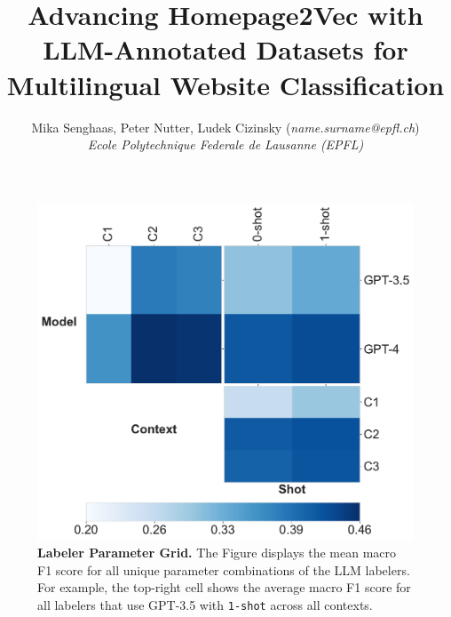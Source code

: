 \documentclass{article}
\begin{document}
\thispagestyle{empty} 

\title{
  Advancing Homepage2Vec with LLM-Annotated Datasets for Multilingual Website Classification
}

\author{
  Mika Senghaas, Peter Nutter, Ludek Cizinsky (\textit{name.surname@epfl.ch}) \\[0.5em]
  \textit{Ecole Polytechnique Federale de Lausanne (EPFL)}\\
}
\maketitle





\begin{figure}[!h]
    \centering
    \includegraphics[width=.8\columnwidth]{figures/labeler-grid.pdf}
    \caption{\textbf{Labeler Parameter Grid.} The Figure displays the mean macro F1 score for all unique parameter combinations of the LLM labelers. For example, the top-right cell shows the average macro F1 score for all labelers that use GPT-3.5 with \texttt{1-shot} across all contexts.}
    \label{fig:labelers-grid}
\end{figure}






\newpage



\appendix


\end{document}
